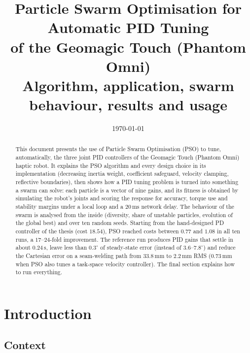 \documentclass[11pt,a4paper]{article}
\title{\textbf{Particle Swarm Optimisation for Automatic PID Tuning\\of the Geomagic Touch (Phantom Omni)}\\[6pt]
\large Algorithm, application, swarm behaviour, results and usage}
\author{}
\date{\today}
\begin{document}
\maketitle

\begin{abstract}
This document presents the use of Particle Swarm Optimisation (PSO) to tune, automatically, the three
joint PID controllers of the Geomagic Touch (Phantom Omni) haptic robot. It explains the PSO algorithm
and every design choice in its implementation (decreasing inertia weight, coefficient safeguard, velocity
clamping, reflective boundaries), then shows how a PID tuning problem is turned into something a swarm
can solve: each particle is a vector of nine gains, and its fitness is obtained by simulating the robot's
joints and scoring the response for accuracy, torque use and stability margins under a local loop and a
$20\,\mathrm{ms}$ network delay. The behaviour of the swarm is analysed from the inside (diversity,
share of unstable particles, evolution of the global best) and over ten random seeds. Starting from the
hand-designed PD controller of the thesis (cost $18.54$), PSO reached costs between $0.77$ and $1.08$ in
all ten runs, a $17$--$24$-fold improvement. The reference run produces PID gains that settle in about
$0.24\,\mathrm{s}$, leave less than $0.3^\circ$ of steady-state error (instead of $3.6$--$7.8^\circ$) and
reduce the Cartesian error on a seam-welding path from $33.8\,\mathrm{mm}$ to $2.2\,\mathrm{mm}$ RMS
($0.73\,\mathrm{mm}$ when PSO also tunes a task-space velocity controller). The final section explains
how to run everything.
\end{abstract}

\tableofcontents
\newpage

\section{Introduction}

\subsection{Context}
\end{document}
